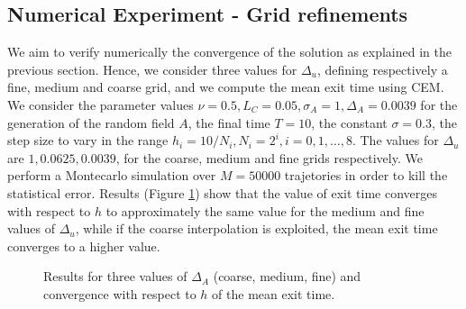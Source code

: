 \subsection{Numerical Experiment - Grid refinements}

We aim to verify numerically the convergence of the solution as explained in the previous section. Hence, we consider three values for $\Delta_u$, defining respectively a fine, medium and coarse grid, and we compute the mean exit time using CEM. We consider the parameter values $\nu = 0.5, L_C = 0.05, \sigma_A = 1, \Delta_A = 0.0039$ for the generation of the random field $A$, the final time $T = 10$, the constant $\sigma = 0.3$, the step size to vary in the range $h_i = 10 / N_i, N_i = 2^i, i = 0, 1, \dots, 8$. The values for $\Delta_u$ are $1, 0.0625, 0.0039$, for the coarse, medium and fine grids respectively. We perform a Montecarlo simulation over $M  = 50000$ trajetories in order to kill the statistical error. Results (Figure \ref{fig:ConvDeltau}) show that the value of exit time converges with respect to $h$ to approximately the same value for the medium and fine values of $\Delta_u$, while if the coarse interpolation is exploited, the mean exit time converges to a higher value.
\begin{figure}[t]
    \centering
    \resizebox{0.8\linewidth}{!}{ }  
    \caption{Results for three values of $\Delta_A$ (coarse, medium, fine) and convergence with respect to $h$ of the mean exit time.}
    \label{fig:ConvDeltau}
\end{figure}
